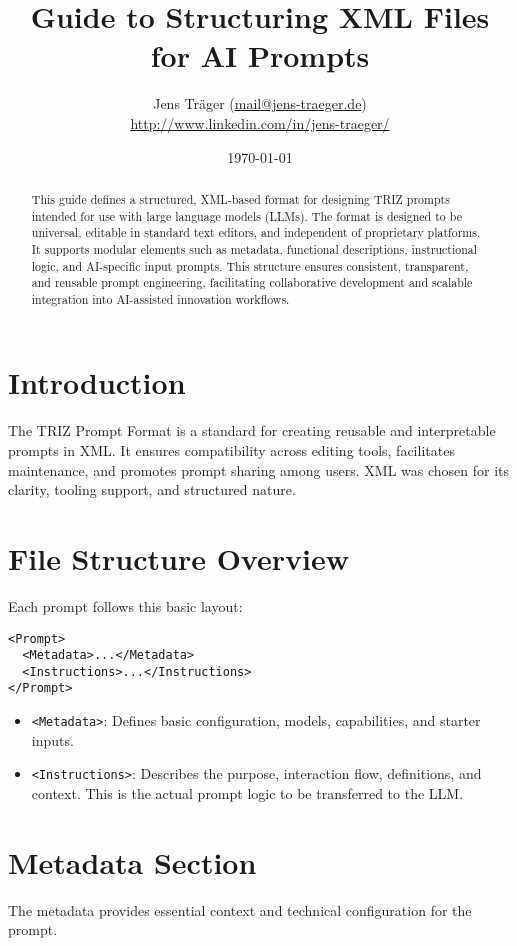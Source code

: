 \documentclass[a4paper,11pt]{refart}
\title{Guide to Structuring XML Files for AI Prompts}
\author{Jens Träger (\url{mail@jens-traeger.de})\\{\footnotesize \url{http://www.linkedin.com/in/jens-traeger/}}}
\date{\today}
\begin{document}
\maketitle

\begin{abstract}
This guide defines a structured, XML-based format for designing TRIZ prompts intended for use with large language models (LLMs). The format is designed to be universal, editable in standard text editors, and independent of proprietary platforms. It supports modular elements such as metadata, functional descriptions, instructional logic, and AI-specific input prompts. This structure ensures consistent, transparent, and reusable prompt engineering, facilitating collaborative development and scalable integration into AI-assisted innovation workflows.
\end{abstract}

\tableofcontents

\section{Introduction}
The TRIZ Prompt Format is a standard for creating reusable and interpretable prompts in XML. It ensures compatibility across editing tools, facilitates maintenance, and promotes prompt sharing among users. XML was chosen for its clarity, tooling support, and structured nature.

\section{File Structure Overview}
Each prompt follows this basic layout:
\begin{lstlisting}
<Prompt>
  <Metadata>...</Metadata>
  <Instructions>...</Instructions>
</Prompt>
\end{lstlisting}

\begin{itemize}
\item \lstinline!<Metadata>!: Defines basic configuration, models, capabilities, and starter inputs.
\item \lstinline!<Instructions>!: Describes the purpose, interaction flow, definitions, and context. This is the actual prompt logic to be transferred to the LLM.
\end{itemize}

\section{Metadata Section}
The metadata provides essential context and technical configuration for the prompt.
\end{document}
